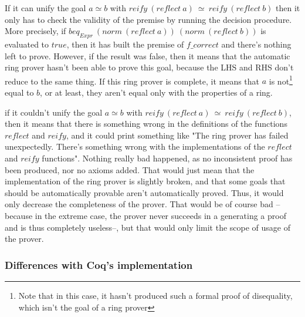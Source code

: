 \itemize
\item
If it can unify the goal $a \simeq b$ with $reify\ (reflect\ a)\ \simeq\ reify\ (reflect\ b)$ then it only has to check the validity of the premise by running the decision procedure. More precisely, if $beq_{Expr}\ (norm\ (reflect\ a))\ (norm\ (reflect\ b))$ is evaluated to $true$, then it has built the premise of $f\_correct$ and there's nothing left to prove. However, if the result was false, then it means that the automatic ring prover hasn't been able to prove this goal, because the LHS and RHS don't reduce to the same thing. If this ring prover is complete, it means that $a$ is not\footnote{Note that in this case, it hasn't produced such a formal proof of disequality, which isn't the goal of a ring prover} equal to $b$, or at least, they aren't equal only with the properties of a ring.
\item
if it couldn't unify the goal $a \simeq b$ with $reify\ (reflect\ a)\ \simeq\ reify\ (reflect\ b)$, then it means that there is something wrong in the definitions of the functions $reflect$ and $reify$, and it could print something like "The ring prover has failed unexpectedly. There's something wrong with the implementations of the $reflect$ and $reify$ functions". Nothing really bad happened, as no inconsistent proof has been produced, nor no axioms added. That would just mean that the implementation of the ring prover is slightly broken, and that some goals that should be automatically provable aren't automatically proved. Thus, it would only decrease the completeness of the prover. That would be of course bad --because in the extreme case, the prover never succeeds in a generating a proof and is thus completely useless--, but that would only limit the scope of usage of the prover. \\

		\subsubsection{Differences with Coq's implementation}

